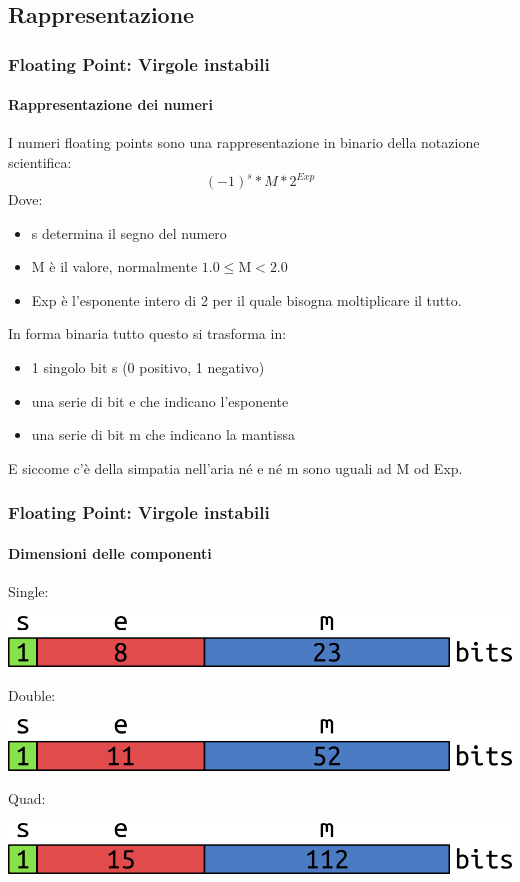 \documentclass{beamer}
\begin{document}
  	\subsection{Rappresentazione}
  \begin{frame}
    \frametitle{Floating Point: Virgole instabili}
    \framesubtitle{Rappresentazione dei numeri}
    I numeri floating points sono una rappresentazione in binario della notazione scientifica:
    $$(-1)^{s} * M * 2^{Exp}$$
    Dove:
    \begin{itemize}
    		\item s determina il segno del numero
    		\item M è il valore, normalmente $1.0 \leq \text{M} < 2.0$
    		\item Exp è l'esponente intero di 2 per il quale bisogna moltiplicare il tutto.
    \end{itemize}
    In forma binaria tutto questo si trasforma in:
    \begin{itemize}
    		\item 1 singolo bit s (0 positivo, 1 negativo)
    		\item una serie di bit e che indicano l'esponente
    		\item una serie di bit m che indicano la mantissa
    \end{itemize}
    E siccome c'è della simpatia nell'aria né e né m sono uguali ad M od Exp.
  \end{frame}
   
	  \begin{frame}
	    \frametitle{Floating Point: Virgole instabili}
	    \framesubtitle{Dimensioni delle componenti}
			Single:
			
			\begin{center}
				\includegraphics[width=.8\textwidth]{IMGs/Single.png}
			\end{center}
			\vspace{1em}
			Double:
			
			\begin{center}
				\includegraphics[width=.8\textwidth]{IMGs/Double.png}
			\end{center}
			\vspace{1em}
			Quad:
			
			\begin{center}
				\includegraphics[width=.8\textwidth]{IMGs/Quad.png}
			\end{center}
	  \end{frame}
\end{document}
